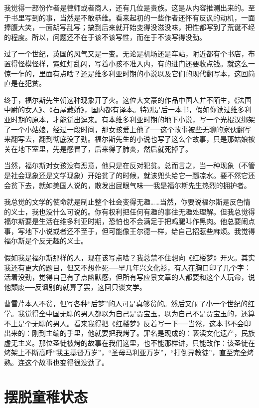 我觉得一部份作者是律师或者商人，还有几位是贵族。这是从内容推测出来的。至于书里写到的事，当然是不敢恭维。看来起初的一些作者还怀有反讽的动机，一面捧腹大笑，一面胡写乱写；搞到后来就开始变得没滋没味，把性都写到了荒诞不经的程度。所以，问题还不在于该不该写性，而在于不该写得没劲。 

过了一个世纪，英国的风气又是一变。无论是机场还是车站，附近都有个书店，布置得怪模怪样，霓虹灯乱闪，写着小孩不准入内，有的进门还要收点钱。就这么一惊一乍的，里面有点啥？还是维多利亚时期的小说以及它们的现代翻写本，这回简直是在犯贫。 

终于，福尔斯先生朝这种现象开了火。这位大文豪的作品中国人并不陌生，《法国中尉的女人》、《石屋藏娇》，国内都有译本。特别是后一本书，假如你读过维多利亚时期的原本，才能觉出逗来。有本维多利亚时期的地下小说，写一个光棍汉绑架了一个小姑娘，经过一段时间，那女孩爱上他了──这个故事被些无聊的家伙翻写来翻写去，翻到彻底没了劲。福尔斯先生的小说也写了这么个故事，只是那姑娘被关在地下室里，先是感冒了，后来得了肺炎，然后就死掉了。 

当然，福尔斯对女孩没有恶意，他只是在反对犯贫。总而言之，当一种现象（不管是社会现象还是文学现象）开始贫了的时候，就该兜头给它一瓢凉水。要不然它还会贫下去，就如美国人说的，散发出屁眼气味──我是福尔斯先生热烈的拥护者。 

我总觉的文学的使命就是制止整个社会变得无趣……当然，你要说福尔斯是反色情的义士，我也没什么可说的。你有权利把任何有趣的事往无趣处理解。但我总觉得福尔斯要是生活在维多利亚时期，恐怕也不会满足于把鸡腿叫作黑肉。他总要闹点事，写地下小说或者还不至于，但可能像王尔德一样，给自己招惹些麻烦。我觉得福尔斯是个反无趣的义士。 

假如我是福尔斯那样的人，现在该写点啥？我总禁不住想向《红楼梦》开火。其实我还有更大的题目，但又不想作死──早几年兴文化衫，有人在胸口印了几个字：活着没劲，觉得自己有了点幽默感，但所有写应景文章的人都要和这个人玩命，说他颓废──反讽别的就算了罢，这回只谈文学。 

曹雪芹本人不贫，但写各种“后梦”的人可是真够贫的。然后又闹了小一个世纪的红学。我觉得全中国无聊的男人都以为自己是贾宝玉，以为自己不是贾宝玉的，还算不上是个无聊的男人。看来我得把《红楼梦》反着写一下──当然，这本书不会印出来的：刚到主编的手里，他就要把我烤了。罪名是现成的：亵渎文化遗产，民族虚无主义。那位圣徒被烤的故事在我们这里，也不能那样讲，只能改作：该圣徒在烤架上不断高呼“我主基督万岁”，“圣母马利亚万岁”，“打倒异教徒”，直至完全烤熟。连这个故事也变得很没劲了。

\chapter{摆脱童稚状态}

